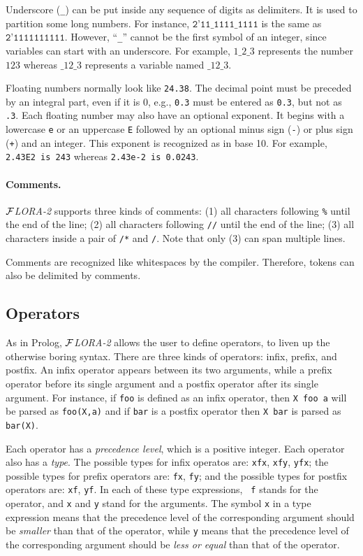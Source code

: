 \documentclass[11pt]{article}
\newcommand{\FLORA}{{\mbox{${\cal F}${\small\it LORA}\rm\emph{-2}}}\xspace}
\begin{document}
Underscore (\texttt{\_}) can be put inside any sequence of digits as
delimiters. It is used to partition some long numbers. For instance,
$\texttt{2'11\_1111\_1111}$ is the same as $\texttt{2'1111111111}$.
However, ``\texttt{\_}'' cannot be the first symbol of an integer, since
variables can start with an underscore. For example, $1\_2\_3$ represents
the number $123$ whereas $\_12\_3$ represents a variable named $\_12\_3$.

Floating numbers normally look like {\tt 24.38}. The decimal point
must be preceded by an integral part, even if it is 0, e.g., {\tt 0.3}
must be entered as {\tt 0.3}, but not as {\tt .3}. Each floating
number may also have an optional exponent. It begins with a lowercase
{\tt e} or an uppercase {\tt E} followed by an optional minus sign
({\tt -}) or plus sign ({\tt +}) and an integer. This exponent is
recognized as in base 10. For example,
\mbox{\tt 2.43E2 is 243} whereas
\mbox{\tt 2.43e-2 is 0.0243}.

\paragraph{Comments.}

%
\FLORA supports three kinds of comments: (1) all characters following
{\tt \%} until the end of the line; (2) all characters following
{\tt //} until the end of the line; (3) all characters inside a pair of
{\tt /*} and {\tt */}. Note that only (3) can span multiple lines.

Comments are recognized like whitespaces by the compiler.  Therefore,
tokens can also be delimited by comments.


\subsection{Operators}


As in Prolog, \FLORA allows the user to define operators, to liven up the
otherwise boring syntax.  There are three kinds of operators: infix,
prefix, and postfix. An infix operator appears between its two arguments,
while a prefix operator before its single argument and a postfix operator
after its single argument. For instance, if {\tt foo} is defined as an
infix operator, then {\tt X foo a} will be parsed as {\tt foo(X,a)} and if
{\tt bar} is a postfix operator then {\tt X bar} is parsed as {\tt bar(X)}. 

%
Each operator has a \emph{precedence level}, which is a positive integer.
Each operator also has a \emph{type}. The possible types for infix operatos
are: {\tt xfx}, {\tt xfy}, {\tt yfx}; the possible types for prefix
operators are: {\tt fx}, {\tt fy}; and the possible types for postfix
operators are: {\tt xf}, {\tt yf}. In each of these type expressions, {\tt
  f} stands for the operator, and {\tt x} and {\tt y} stand for the
arguments.  The symbol {\tt x} in a type expression means that the
precedence level of the corresponding argument should be \emph{smaller}
than that of the operator, while {\tt y} means that the precedence level of
the corresponding argument should be \emph{less or equal} than that of the
operator.
\end{document}
